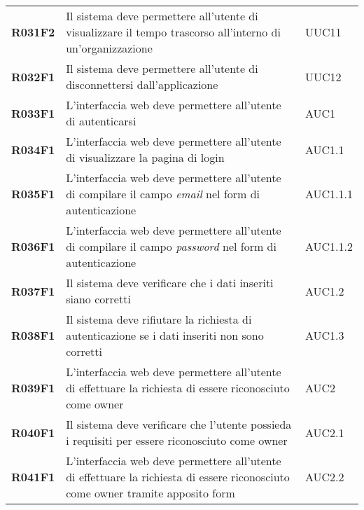 \documentclass[../analisi-dei-requisiti]{subfiles}
\begin{document}
\begin{longtable}[H]{>{\centering\bfseries}m{3cm} >{\centering}m{10cm} >{\centering\arraybackslash}m{3cm}}
  R031F2                  & Il sistema deve permettere all'utente di visualizzare il tempo trascorso all'interno di un'organizzazione                                      & UUC11                         \\
  R032F1                  & Il sistema deve permettere all'utente di disconnettersi dall'applicazione                                                                      & UUC12                         \\
  R033F1                  & L'interfaccia web deve permettere all'utente di autenticarsi                                                                                   & AUC1                          \\
  R034F1                  & L'interfaccia web deve permettere all'utente di visualizzare la pagina di login                                                                & AUC1.1                        \\
  R035F1                  & L'interfaccia web deve permettere all'utente di compilare il campo \textit{email} nel form di autenticazione                                   & AUC1.1.1                      \\
  R036F1                  & L'interfaccia web deve permettere all'utente di compilare il campo \textit{password} nel form di autenticazione                                & AUC1.1.2                      \\
  R037F1                  & Il sistema deve verificare che i dati inseriti siano corretti                                                                                  & AUC1.2                        \\
  R038F1                  & Il sistema deve rifiutare la richiesta di autenticazione se i dati inseriti non sono corretti                                                  & AUC1.3                        \\
  R039F1                  & L'interfaccia web deve permettere all'utente di effettuare la richiesta di essere riconosciuto come owner                                      & AUC2                          \\
  R040F1                  & Il sistema deve verificare che l'utente possieda i requisiti per essere riconosciuto come owner                                                & AUC2.1                        \\
  R041F1                  & L'interfaccia web deve permettere all'utente di effettuare la richiesta di essere riconosciuto come owner tramite apposito form                & AUC2.2                        \\

\end{longtable}
\end{document}
